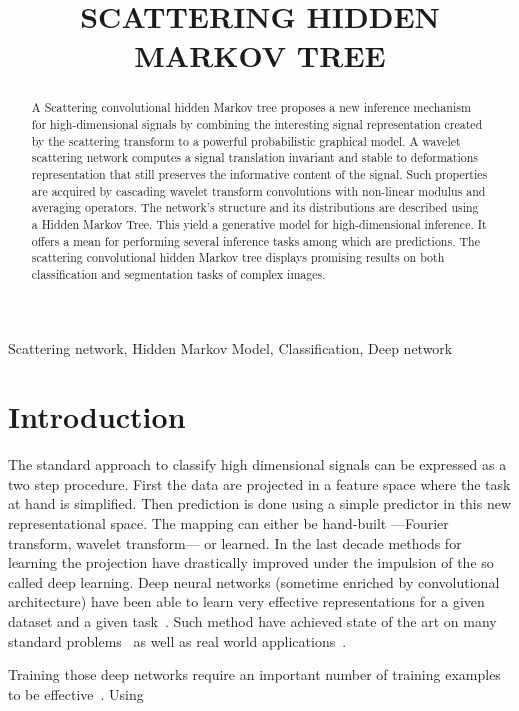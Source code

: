 \documentclass{article}
\title{SCATTERING HIDDEN MARKOV TREE}
\begin{document}
%
\maketitle
%
\begin{abstract}
	A Scattering convolutional hidden Markov tree proposes a new inference mechanism for high-dimensional signals by combining the interesting signal representation created by the scattering transform to a powerful probabilistic graphical model.
	A wavelet scattering network computes a signal translation invariant and stable to deformations representation that still preserves the informative content of the signal. Such properties are acquired by cascading wavelet transform convolutions with non-linear modulus and averaging operators.
	The network's structure and its distributions are described using a Hidden Markov Tree. This yield a generative model for high-dimensional inference. It offers a mean for performing several inference tasks among which are predictions. The scattering convolutional hidden Markov tree displays promising results on both classification and segmentation tasks of complex images.
\end{abstract}
%
\begin{keywords}
	Scattering network, Hidden Markov Model, Classification, Deep network
\end{keywords}
%
\section{Introduction}
\label{sec:Intro}

  The standard approach to classify high dimensional signals can be expressed as a two step procedure. First the data are projected in a feature space where the task at hand is simplified. Then prediction is done using a simple predictor in this new representational space. The mapping can either be hand-built ---\eg Fourier transform, wavelet transform--- or learned. In the last decade methods for learning the projection have drastically improved under the impulsion of the so called deep learning. Deep neural networks (sometime enriched by convolutional architecture) have been able to learn very effective representations for a given dataset and a given task~\cite{DNN, CNN}. Such method have achieved state of the art on many standard problems~\cite{alexNet} as well as real world applications~\cite{microsoft cortana}. 
  
  Training those deep networks require an important number of training examples to be effective~\cite{training example in DNN}. Using    
  ~\cite{one shot learning }
		
\end{document}
